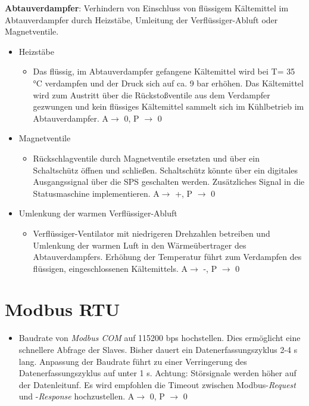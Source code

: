 		
		
\textbf{Abtauverdampfer}: 
Verhindern von Einschluss von flüssigem Kältemittel im Abtauverdampfer durch Heizstäbe, Umleitung der Verflüssiger-Abluft oder Magnetventile. 
	\begin{itemize}
\item  Heizstäbe
\begin{itemize}
	\item  Das flüssig, im Abtauverdampfer gefangene Kältemittel  wird bei T= 35 °C  verdampfen und der Druck sich auf ca. 9 bar erhöhen. Das Kältemittel wird zum Austritt über die Rückstoßventile aus dem Verdampfer gezwungen und kein flüssiges Kältemittel sammelt sich im Kühlbetrieb im Abtauverdampfer. A$\rightarrow$ 0, P $\rightarrow$ 0
\end{itemize} 

\item Magnetventile
\begin{itemize}
	\item  Rückschlagventile durch Magnetventile ersetzten und über ein Schaltschütz öffnen und schließen. Schaltschütz könnte über ein digitales Ausgangssignal über die SPS geschalten werden. Zusätzliches Signal in die Statusmaschine implementieren. 
	A$\rightarrow$ +, P $\rightarrow$ 0
\end{itemize}

\item Umlenkung der warmen Verflüssiger-Abluft 

\begin{itemize}
\item	Verflüssiger-Ventilator mit niedrigeren Drehzahlen betreiben und Umlenkung der warmen Luft in den Wärmeübertrager des Abtauverdampfers. Erhöhung der Temperatur führt zum Verdampfen des flüssigen, eingeschlossenen Kältemittels. 
A$\rightarrow$ -, P $\rightarrow$ 0
\end{itemize} 
	\end{itemize}	
	
\section*{Modbus RTU}
\begin{itemize}

\item Baudrate von \textit{Modbus COM} auf 115200 bps hochstellen. Dies ermöglicht eine schnellere Abfrage der Slaves. Bisher dauert ein Datenerfassungszyklus 2-4 s lang. Anpassung der Baudrate führt zu einer Verringerung des Datenerfassungszyklus auf  unter 1 s. Achtung: Störsignale werden höher auf der Datenleitunf. Es wird empfohlen die Timeout zwischen Modbus-\textit{Request} und -\textit{Response} hochzustellen. A$\rightarrow$ 0, P $\rightarrow$ 0

\end{itemize}

